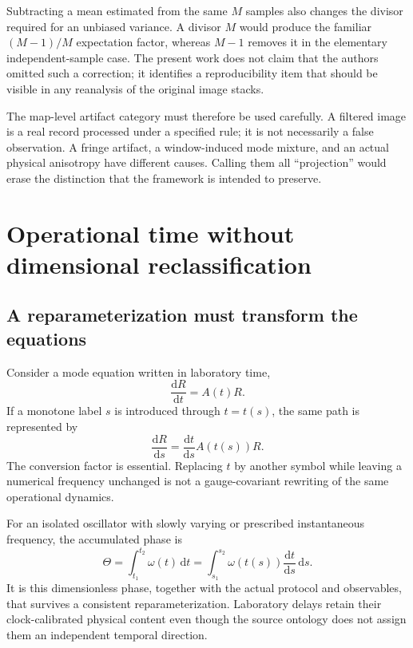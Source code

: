 \documentclass[11pt,a4paper]{article}
\theoremstyle{definition}
\theoremstyle{remark}
\newcommand{\dd}{\mathrm{d}}
\begin{document}
Subtracting a mean estimated from the same $M$ samples also changes the divisor required for an unbiased variance. A divisor $M$ would produce the familiar $(M-1)/M$ expectation factor, whereas $M-1$ removes it in the elementary independent-sample case. The present work does not claim that the authors omitted such a correction; it identifies a reproducibility item that should be visible in any reanalysis of the original image stacks.

The map-level artifact category must therefore be used carefully. A filtered image is a real record processed under a specified rule; it is not necessarily a false observation. A fringe artifact, a window-induced mode mixture, and an actual physical anisotropy have different causes. Calling them all ``projection'' would erase the distinction that the framework is intended to preserve.\cite{foundation,zhang2026}

\section{Operational time without dimensional reclassification}
\label{sec:time}
\subsection{A reparameterization must transform the equations}
Consider a mode equation written in laboratory time,
\begin{equation}
 \frac{\dd R}{\dd t}=A(t)R.
 \label{eq:lab_dynamics}
\end{equation}
If a monotone label $s$ is introduced through $t=t(s)$, the same path is represented by
\begin{equation}
 \frac{\dd R}{\dd s}=\frac{\dd t}{\dd s}A(t(s))R.
 \label{eq:reparameterized}
\end{equation}
The conversion factor is essential. Replacing $t$ by another symbol while leaving a numerical frequency unchanged is not a gauge-covariant rewriting of the same operational dynamics.

For an isolated oscillator with slowly varying or prescribed instantaneous frequency, the accumulated phase is
\begin{equation}
 \Theta=\int_{t_1}^{t_2}\omega(t)\,\dd t
 =\int_{s_1}^{s_2}\omega(t(s))\frac{\dd t}{\dd s}\,\dd s.
 \label{eq:phase_invariant}
\end{equation}
It is this dimensionless phase, together with the actual protocol and observables, that survives a consistent reparameterization. Laboratory delays retain their clock-calibrated physical content even though the source ontology does not assign them an independent temporal direction.\cite{foundation,minkowski}
\end{document}
